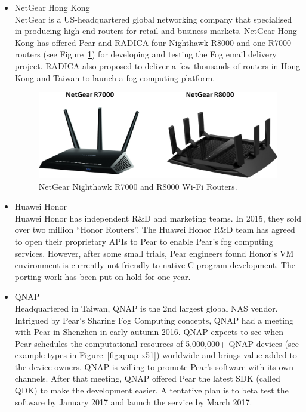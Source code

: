 \begin{itemize}
	\item NetGear Hong Kong\\
	NetGear is a US-headquartered global networking company that specialised in producing high-end routers for retail and business markets. NetGear Hong Kong has offered Pear and RADICA four Nighthawk R8000 and one R7000 routers (see Figure~\ref{fig:netgear-r7000-r8000}) for developing and testing the Fog email delivery project. RADICA also proposed to deliver a few thousands of routers in Hong Kong and Taiwan to launch a fog computing platform. 
	\begin{figure}[ht]
		\centering
		\includegraphics[width=.7\textwidth]{fig/biz/netgear-r7000-r8000.png}
		\caption{NetGear Nighthawk R7000 and R8000 Wi-Fi Routers.} \label{fig:netgear-r7000-r8000}
	\end{figure}
	\item Huawei Honor\\
	Huawei Honor has independent R\&D and marketing teams. In 2015, they sold over two million ``Honor Routers''. The Huawei Honor R\&D team has agreed to open their proprietary APIs to Pear to enable Pear's fog computing services. However, after some small trials, Pear engineers found Honor's VM environment is currently not friendly to native C program development. The porting work has been put on hold for one year. 
	\item QNAP\\
	Headquartered in Taiwan, QNAP is the 2nd largest global NAS vendor. Intrigued by Pear's Sharing Fog Computing concepts, QNAP had a meeting with Pear in Shenzhen in early autumn 2016. QNAP expects to see when Pear schedules the computational resources of 5,000,000+ QNAP devices (see example types in Figure~\ref{fig:qnap-x51}) worldwide and brings value added to the device owners. QNAP is willing to promote Pear's software with its own channels. After that meeting, QNAP offered Pear the latest SDK (called QDK) to make the development easier. A tentative plan is to beta test the software by January 2017 and launch the service by March 2017.
	\begin{figure}[ht]
		\centering

\end{figure}
\end{itemize}
